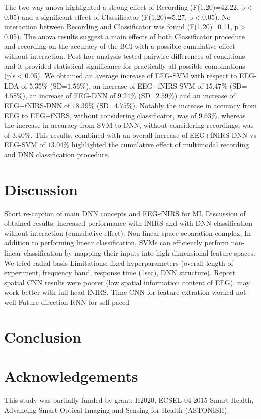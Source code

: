\documentclass[12pt ]{iopart}
\begin{document}
The two-way anova highlighted a strong effect of Recording (F(1,20)=42.22, p$<$0.05) and a significant effect of Classificator (F(1,20)=5.27, p$<$0.05). No interaction between Recording and Classificator was found (F(1,20)=0.11, p$>$0.05). The anova results suggest a main effects of both Classificator procedure and recording on the accuracy of the BCI with a possible cumulative effect without interaction.
Post-hoc analysis tested pairwise differences  of conditions and it provided statistical significance for practically  all possible combinations (p's$<$0.05).
We obtained an average increase of EEG-SVM with respect to EEG-LDA of $5.35\%$ (SD=$1.56\%$), an increase of EEG+fNIRS-SVM of $15.47\%$ (SD=$4.58\%$), an increase of EEG-DNN of $9.24\%$ (SD=$2.59\%$) and an increase of EEG+fNIRS-DNN of $18.39\%$ (SD=$4.75\%$). Notably the increase in accuracy from EEG to EEG+fNIRS, without considering classificator, was of $9.63\%$, whereas the increase in accuracy from SVM to DNN, without considering recordings, was of  $3.40\%$. This results, combined with an overall increase of EEG+fNIRS-DNN vs EEG-SVM of  $13.04\%$ highlighted the cumulative effect of multimodal recording and DNN classification procedure.

\section{Discussion}
Short re-caption of main DNN concepts and EEG-fNIRS for MI.
Discussion of obtained results:
increased performance with fNIRS and with DNN classification without interaction (cumulative effect).
Non linear space separation complex, 
In addition to performing linear classification, SVMs can efficiently perform  non-linear classification by mapping their inputs into high-dimensional feature spaces.
We tried radial basis
Limitations: fixed hyperparameters
(overall length of experiment, frequency band, response time (1sec), DNN structure). 
Report spatial CNN results were poorer (low spatial information content of EEG), may work better with full-head fNIRS. Time CNN for feature extration worked not well
Future direction RNN for self paced


\section{Conclusion}

\section{Acknowledgements}
This study was partially funded by grant: H2020, ECSEL-04-2015-Smart Health, Advancing Smart Optical Imaging and Sensing for Health (ASTONISH).
 

\newpage
\printbibliography
\cleardoublepage
{}
\end{document}
